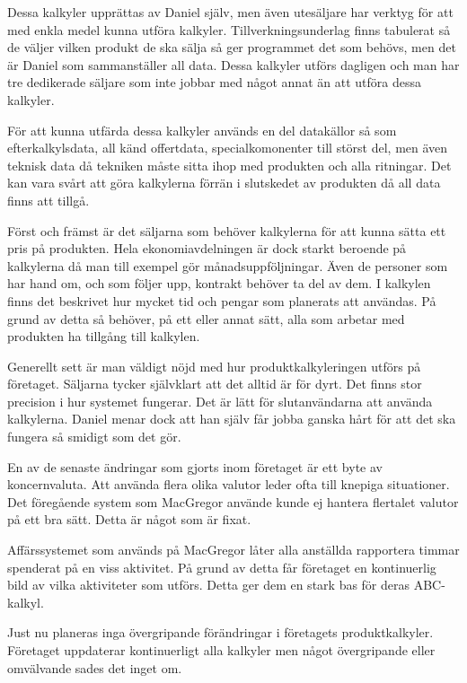 Dessa kalkyler upprättas av Daniel själv, men även utesäljare har verktyg för att med enkla medel kunna utföra kalkyler. 
Tillverkningsunderlag finns tabulerat så de väljer vilken produkt de ska sälja så ger programmet det som behövs, men det är Daniel som sammanställer all data.
Dessa kalkyler utförs dagligen och man har tre dedikerade säljare som inte jobbar med något annat än att utföra dessa kalkyler.

För att kunna utfärda dessa kalkyler används en del datakällor så som efterkalkylsdata, all känd offertdata, specialkomonenter till störst del, men även teknisk data då tekniken måste sitta ihop med produkten och alla ritningar.
Det kan vara svårt att göra kalkylerna förrän i slutskedet av produkten då all data finns att tillgå.  

Först och främst är det säljarna som behöver kalkylerna för att kunna sätta ett pris på produkten.
Hela ekonomiavdelningen är dock starkt beroende på kalkylerna då man till exempel gör månadsuppföljningar.
Även de personer som har hand om, och som följer upp, kontrakt behöver ta del av dem.
I kalkylen finns det beskrivet hur mycket tid och pengar som planerats att användas.
På grund av detta så behöver, på ett eller annat sätt, alla som arbetar med produkten ha tillgång till kalkylen.

Generellt sett är man väldigt nöjd med hur produktkalkyleringen utförs på företaget.
Säljarna tycker självklart att det alltid är för dyrt.
Det finns stor precision i hur systemet fungerar.
Det är lätt för slutanvändarna att använda kalkylerna.
Daniel menar dock att han själv får jobba ganska hårt för att det ska fungera så smidigt som det gör.

En av de senaste ändringar som gjorts inom företaget är ett byte av koncernvaluta.
Att använda flera olika valutor leder ofta till knepiga situationer.
Det föregående system som MacGregor använde kunde ej hantera flertalet valutor på ett bra sätt.
Detta är något som är fixat.

Affärssystemet som används på MacGregor låter alla anställda rapportera timmar spenderat på en viss aktivitet.
På grund av detta får företaget en kontinuerlig bild av vilka aktiviteter som utförs.
Detta ger dem en stark bas för deras ABC-kalkyl.

Just nu planeras inga övergripande förändringar i företagets produktkalkyler. Företaget uppdaterar kontinuerligt alla kalkyler men något övergripande eller omvälvande sades det inget om.

